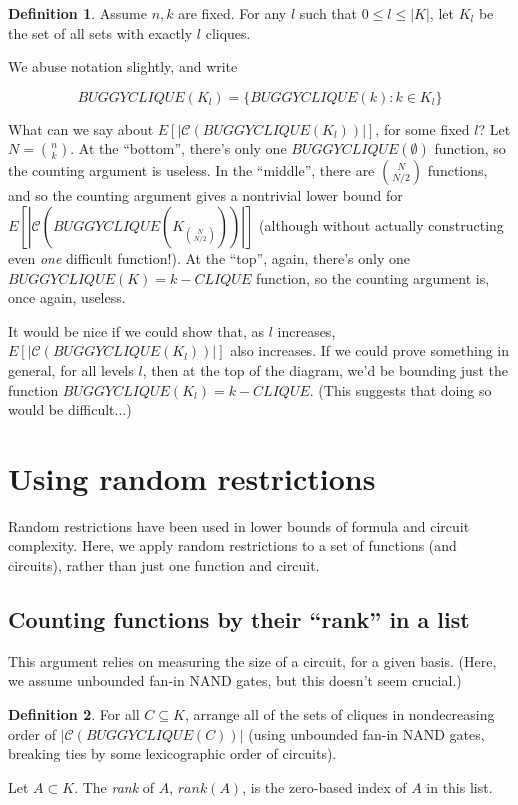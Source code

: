 \documentclass[12pt]{article}
\theoremstyle{definition}
\newtheorem{defn}{Definition}[section]
\newcommand{\bigC}[0]{\mathcal{C}}
\begin{document}
\begin{defn}
\label{CLIQUE-level}
Assume $n, k$ are fixed. For any $l$ such that
$0 \le l \le |K|$, let $K_l$ be the set of all sets
with exactly $l$ cliques. 
\end{defn}

We abuse notation slightly, and write

\[
BUGGYCLIQUE(K_l) = \{ BUGGYCLIQUE(k) : k \in K_l \}
\]

What can we say about $E[|\bigC(BUGGYCLIQUE(K_l))|]$, for
some fixed $l$? Let $N = {n \choose k}$.
At the ``bottom'', there's only one $BUGGYCLIQUE(\emptyset)$
function, so the counting argument is useless.
In the ``middle'',
there are ${N \choose {N/2}}$ functions, and so the counting
argument gives a nontrivial lower bound for
$E[|\bigC(BUGGYCLIQUE(K_{N \choose {N/2}}))|]$ (although
without actually constructing even {\em one} difficult function!).
At the ``top'', again, there's only one $BUGGYCLIQUE(K) = k-CLIQUE$
function, so the counting argument is, once again, useless.

It would be nice if we could show that, as $l$ increases,
$E[|\bigC(BUGGYCLIQUE(K_l))|]$ also increases.
If we could prove something in general, for all levels $l$, then at
the top of the diagram, we'd be bounding just the function
$BUGGYCLIQUE(K_l) = k-CLIQUE$. (This suggests that doing so would
be difficult...)


\section{Using random restrictions}

Random restrictions have been used in lower bounds of formula
\cite{subbotovskaya1963comparison} and circuit \cite{hastad1987lower}
complexity.
Here, we apply random restrictions to a set of functions (and circuits),
rather than just one function and circuit.

\subsection{Counting functions by their ``rank'' in a list}

This argument relies on measuring the size of a circuit,
for a given basis. (Here, we assume unbounded fan-in
NAND gates, but this doesn't seem crucial.)

\begin{defn}
\label{Rank}
For all $C \subseteq K$,
arrange all of the sets of cliques in nondecreasing order
of $|\bigC(BUGGYCLIQUE(C))|$ (using unbounded fan-in NAND gates,
breaking ties by some lexicographic order of circuits).

Let $A \subset K$. The {\em rank} of $A$, $rank(A)$, is the zero-based
index of $A$ in this list.
\end{defn}
\end{document}
